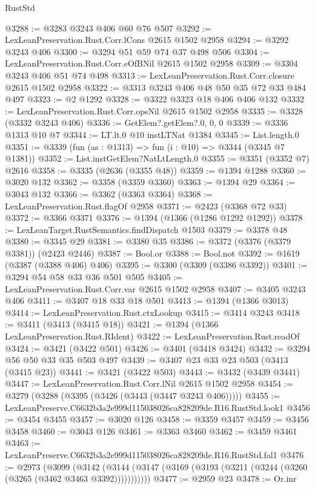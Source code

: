 \begin{lexlean}{RustStd}
\begin{coremodule}
@3288 := @3283 @3243 @406 @60 @76 @507
@3292 := LexLeanPreservation.Rust.Corr.lCons @2615 @1502 @2958
@3294 := @3292 @3243 @406
@3300 := @3294 @51 @59 @74 @37 @498 @506
@3304 := LexLeanPreservation.Rust.Corr.eOfBNil @2615 @1502 @2958
@3309 := @3304 @3243 @406 @51 @74 @498
@3313 := LexLeanPreservation.Rust.Corr.closure @2615 @1502 @2958
@3322 := @3313 @3243 @406 @48 @50 @35 @72 @33 @484 @497
@3323 := @2 @1292
@3328 := @3322 @3323 @18 @406 @406 @132
@3332 := LexLeanPreservation.Rust.Corr.opsNil @2615 @1502 @2958
@3335 := @3328 (@3332 @3243 @406)
@3336 := GetElem?.getElem?.{0, 0, 0}
@3339 := @3336 @1313 @10 @7
@3344 := LT.lt.{0} @10 instLTNat @1384
@3345 := List.length.{0}
@3351 := @3339 (fun (as : @1313) => fun (i : @10) => @3344 (@3345 @7 @1381))
@3352 := List.instGetElem?NatLtLength.{0}
@3355 := @3351 (@3352 @7) @2616
@3358 := @3335 (@2636 (@3355 @48))
@3359 := @1394 @1288
@3360 := @3020 @132
@3362 := @3358 (@3359 @3360)
@3363 := @1394 @29
@3364 := @3043 @132
@3366 := @3362 (@3363 @3364)
@3368 := LexLeanPreservation.Rust.flagOf @2958
@3371 := @2423 (@3368 @72 @33)
@3372 := @3366 @3371
@3376 := @1394 (@1366 (@1286 @1292 @1292))
@3378 := LexLeanTarget.RustSemantics.findDispatch @1503
@3379 := @3378 @48
@3380 := @3345 @29
@3381 := @3380 @35
@3386 := @3372 (@3376 (@3379 @3381)) (@2423 @2446)
@3387 := Bool.or
@3388 := Bool.not
@3392 := @1619 (@3387 (@3388 @406) @406)
@3395 := @3300 (@3309 (@3386 @3392))
@3401 := @3294 @54 @58 @33 @36 @501 @505
@3405 := LexLeanPreservation.Rust.Corr.var @2615 @1502 @2958
@3407 := @3405 @3243 @406
@3411 := @3407 @18 @33 @18 @501
@3413 := @1394 (@1366 @3013)
@3414 := LexLeanPreservation.Rust.ctxLookup
@3415 := @3414 @3243
@3418 := @3411 (@3413 (@3415 @18))
@3421 := @1394 (@1366 LexLeanPreservation.Rust.RIdent)
@3422 := LexLeanPreservation.Rust.readOf
@3424 := @3421 (@3422 @501)
@3426 := @3401 (@3418 @3424)
@3432 := @3294 @56 @50 @33 @35 @503 @497
@3439 := @3407 @23 @33 @23 @503 (@3413 (@3415 @23))
@3441 := @3421 (@3422 @503)
@3443 := @3432 (@3439 @3441)
@3447 := LexLeanPreservation.Rust.Corr.lNil @2615 @1502 @2958
@3454 := @3279 (@3288 (@3395 (@3426 (@3443 (@3447 @3243 @406)))))
@3455 := LexLeanPreserve.C6632b3a2e999d115038026ca828209de.R16.RustStd.look1
@3456 := @3454 @3455
@3457 := @3020 @126
@3458 := @3359 @3457
@3459 := @3456 @3458
@3460 := @3043 @126
@3461 := @3363 @3460
@3462 := @3459 @3461
@3463 := LexLeanPreserve.C6632b3a2e999d115038026ca828209de.R16.RustStd.fal1
@3476 := @2973
    (@3099
      (@3142 (@3144 (@3147 (@3169 (@3193 (@3211 (@3244 (@3260 (@3265 (@3462 @3463 @3392)))))))))))
@3477 := @2959 @23
@3478 := Or.inr

\end{coremodule}
\end{lexlean}
